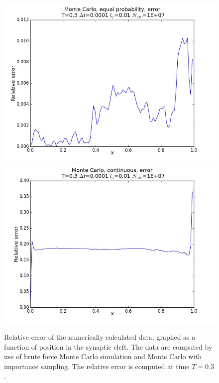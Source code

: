 \documentclass[12pt]{article}
\begin{document}
\begin{flushleft}
\begin{figure}[!h]
  \begin{minipage}{\linewidth}
    \centering
    {\includegraphics[scale=0.27]{relative_error_MC}}
     {\includegraphics[scale=0.27]{relative_error_MC_importance}}
    \caption{Relative error of the numerically calculated data, graphed as a function of position in the synaptic cleft. The data are computed by use of brute force Monte Carlo simulation and Monte Carlo with importance sampling. The relative error is computed at time $T = 0.3$.}
  \end{minipage}
\end{figure}


\end{flushleft}
\end{document}
